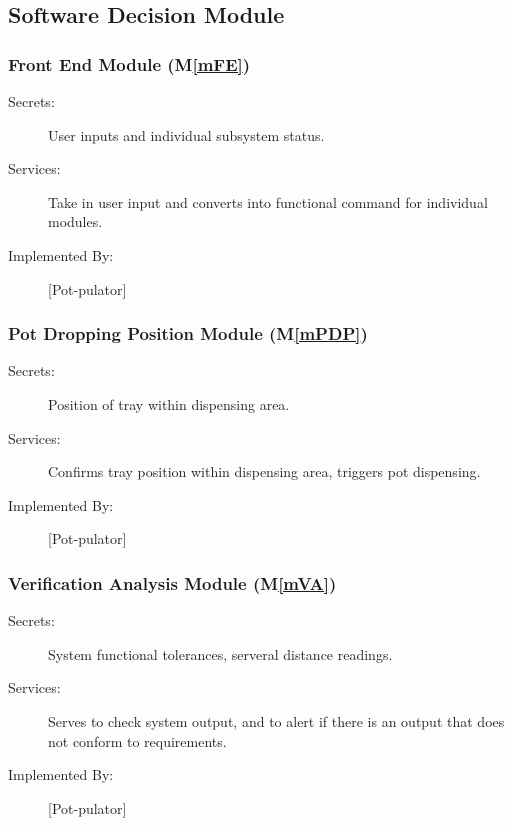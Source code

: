 \documentclass[12pt, titlepage]{article}
\newcommand{\mref}[1]{M\ref{#1}}
\begin{document}
\subsection{Software Decision Module}


\subsubsection{Front End Module (\mref{mFE})}
\begin{description}
\item[Secrets:] User inputs and individual subsystem status.
\item[Services:] Take in user input and converts into functional command for individual modules.
\item[Implemented By:] [Pot-pulator]

\end{description}



\subsubsection{Pot Dropping Position Module (\mref{mPDP})}
\begin{description}
\item[Secrets:] Position of tray within dispensing area.
\item[Services:] Confirms tray position within dispensing area, triggers pot dispensing.
\item[Implemented By:] [Pot-pulator]

\end{description}

\subsubsection{Verification Analysis Module (\mref{mVA})}
\begin{description}
\item[Secrets:] System functional tolerances,  serveral distance readings.
\item[Services:] Serves to check system output, and to alert if there is an output that does not conform to requirements.
\item[Implemented By:] [Pot-pulator]

\end{description}
\end{document}
